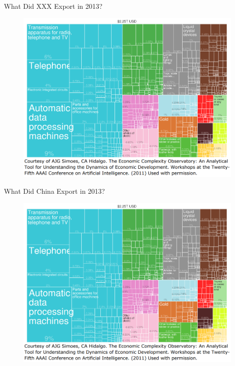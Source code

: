 \documentclass[10pt,hyperref={CJKbookmarks=true},xcolor=dvipsnames,aspectratio=169]{beamer}
\begin{document}
\begin{frame}{What Did XXX Export in 2013?}


\begin{figure}
\includegraphics[scale=0.35]{fig/gravity/com2-3.PNG}
\end{figure}

\end{frame}

\begin{frame}{What Did China Export in 2013?}


\begin{figure}
\includegraphics[scale=0.35]{fig/gravity/com2-3.PNG}
\end{figure}

\end{frame}
\end{document}

